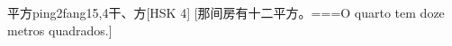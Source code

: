 \begin{EntryWithPhonetic}{平方}{ping2fang1}{5,4}{⼲、⽅}[HSK 4]
  [那间房有十二平方。===O quarto tem doze metros quadrados.]
\end{EntryWithPhonetic}
